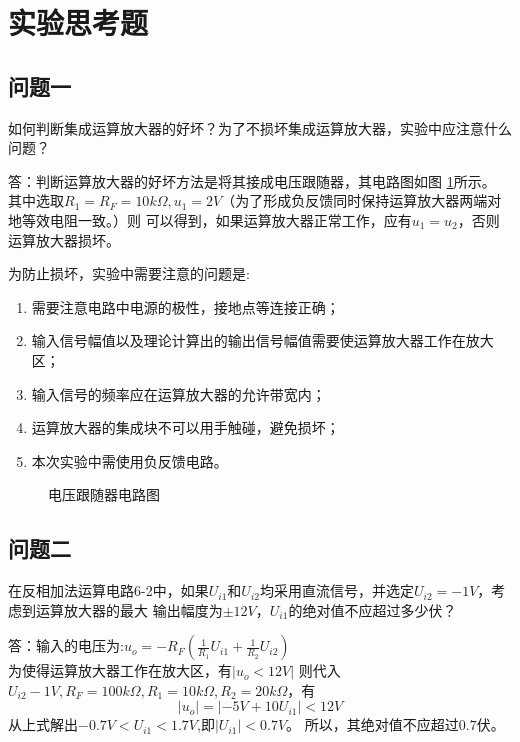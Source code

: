 \documentclass[a4paper,11pt,UTF8]{ctexart}
\begin{document}
\section{实验思考题}
\subsection{问题一}
如何判断集成运算放大器的好坏？为了不损坏集成运算放大器，实验中应注意什么问题？

答：判断运算放大器的好坏方法是将其接成电压跟随器，其电路图如图 \ref{fig:follow}所示。
其中选取$R_1=R_F=10k\Omega,u_1=2V$（为了形成负反馈同时保持运算放大器两端对地等效电阻一致。）则
可以得到，如果运算放大器正常工作，应有$u_1=u_2$，否则运算放大器损坏。

为防止损坏，实验中需要注意的问题是:
\begin{enumerate}
  \item 需要注意电路中电源的极性，接地点等连接正确；
  \item 输入信号幅值以及理论计算出的输出信号幅值需要使运算放大器工作在放大区；
  \item 输入信号的频率应在运算放大器的允许带宽内；
  \item 运算放大器的集成块不可以用手触碰，避免损坏；
  \item 本次实验中需使用负反馈电路。
\end{enumerate}


\begin{figure}[htbp]
  \centering
  \caption{电压跟随器电路图}
  \label{fig:follow}
  \end{figure}
\subsection{问题二}
在反相加法运算电路6-2中，如果$U_{i1}$和$U_{i2}$均采用直流信号，并选定$U_{i2}=-1V$，考虑到运算放大器的最大
输出幅度为$±12V$，$U_{i1}$的绝对值不应超过多少伏？

答：输入的电压为:$u_o=-R_F(\frac{1}{R_1}U_{i1}+\frac{1}{R_2}U_{i2})$\\
为使得运算放大器工作在放大区，有$|u_o<12V|$
则代入$U_{i2}-1V,R_F=100k\Omega,R_1=10k\Omega,R_2=20k\Omega$，有
\begin{equation}
  |u_o|=|-5V+10U_{i1}|<12V
\end{equation}
从上式解出$-0.7V<U_{i1}<1.7V$,即$|U_{i1}|<0.7V$。
所以，其绝对值不应超过$0.7$伏。
\end{document}
